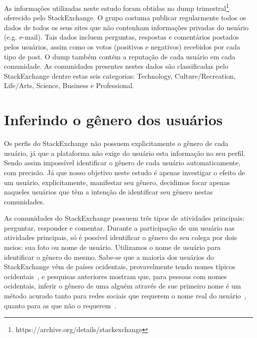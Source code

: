 As informações utilizadas neste estudo foram obtidas no dump trimestral\footnote{https://archive.org/details/stackexchange} oferecido pelo StackExchange. O grupo costuma publicar regularmente todos os dados de todos os seus sites que não contenham informações privadas do usuário (e.g. e-mail). Tais dados incluem perguntas, respostas e comentários postados pelos usuários, assim como os votos (positivos e negativos) recebidos por cada tipo de post. O dump também contém a reputação de cada usuário em cada comunidade. As comunidades presentes nestes dados são classificadas pelo StackExchange dentre estas seis categorias: Technology, Culture/Recreation, Life/Arts, Science, Business e Professional.

\section{Inferindo o gênero dos usuários}

Os perfis do StackExchange não possuem explicitamente o gênero de cada usuário, já que a plataforma não exige do usuário esta informação no seu perfil. Sendo assim impossível identificar o gênero de cada usuário automaticamente, com precisão. Já que nosso objetivo neste estudo é apenas investigar o efeito de um usuário, explicitamente, manifestar seu gênero, decidimos focar apenas naqueles usuários que têm a intenção de identificar seu gênero nestas comunidades.

As comunidades do StackExchange possuem três tipos de atividades principais: perguntar, responder e comentar. Durante a participação de um usuário nas atividades principais, só é possível identificar o gênero do seu colega por dois meios: sua foto ou nome de usuário. Utilizamos o nome de usuário para identificar o gênero do mesmo. Sabe-se que a maioria dos usuários do StackExchange vêm de países ocidentais, provavelmente tendo nomes típicos ocidentais~\cite{schenk2013geo}, e pesquisas anteriores mostram que, para pessoas com nomes ocidentais, inferir o gênero de uma alguém através de sue primeiro nome é um método acurado tanto para redes sociais que requerem o nome real do usuário~\cite{tang2011s}, quanto para as que não o requerem~\cite{burger2011discriminating,liu2013s}.

